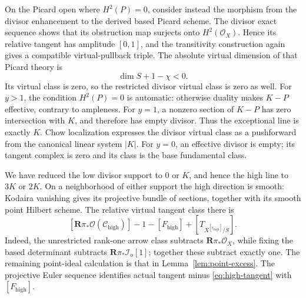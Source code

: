 On the Picard open where \(H^2(P)=0\), consider instead the morphism
from the divisor enhancement to the derived based Picard scheme.
The divisor exact sequence shows that its obstruction map surjects
onto \(H^2(\mathcal O_X)\). Hence its relative tangent has amplitude
\([0,1]\), and the transitivity construction again gives a compatible
virtual-pullback triple.
The absolute virtual dimension of that Picard theory is
\[
 \dim S+1-\chi<0.
\]
Its virtual class is zero, so the restricted divisor virtual class
is zero as well.
For \(y>1\), the condition \(H^2(P)=0\) is automatic: otherwise
duality makes \(K-P\) effective, contrary to ampleness.
For \(y=1\), a nonzero section of \(K-P\) has zero intersection with
\(K\), and therefore has empty divisor. Thus the exceptional line is
exactly \(K\). Chow localization expresses the divisor virtual class
as a pushforward from the canonical linear system \(|K|\).
For \(y=0\), an effective divisor is empty; its tangent complex is
zero and its class is the base fundamental class.

We have reduced the low divisor support to \(0\) or \(K\), and hence
the high line to \(3K\) or \(2K\). On a neighborhood of either support
the high direction is smooth: Kodaira vanishing gives its projective
bundle of sections, together with its smooth point Hilbert scheme.
The relative virtual tangent class there is
\begin{equation}
\label{eq:high-tangent}
 [\mathbf R\pi_*\mathcal O(\mathcal C_{\mathrm{high}})]
 -1-[F_{\mathrm{high}}]+[T_{X^{[r_{\mathrm{high}}]}/S}].
\end{equation}
Indeed, the unrestricted rank-one arrow class subtracts
\(\mathbf R\pi_*\mathcal O_X\), while fixing the based determinant
subtracts \(\mathbf R\pi_*\mathcal I_o[1]\); together these subtract
exactly one. The remaining point-ideal calculation is that in
Lemma~\ref{lem:point-excess}.
The projective Euler sequence identifies actual tangent minus
\eqref{eq:high-tangent} with \([F_{\mathrm{high}}]\).

